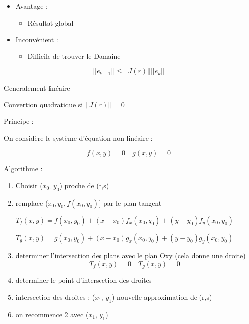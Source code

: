 
\begin{itemize}
    \item Avantage : 
    \begin{itemize}
        \item Résultat global 
    \end{itemize}
    \item Inconvénient : 
    \begin{itemize}
        \item Difficile de trouver le Domaine
    \end{itemize}
\end{itemize}


$$||e_{k+1}|| \leq ||J(r)|| ||e_k||$$

Generalement linéaire

Convertion quadratique si $||J(r)|| = 0$


Principe :

On considère le système d'équation non linéaire :

$$f(x,y) = 0 \quad g(x,y) = 0$$

Algorithme :

\begin{enumerate}
    \item Choisir ($x_0$, $y_0$) proche de (r,s)
    \item remplace ($x_0, y_0,f(x_0, y_0)$) par le plan tangent

    {\hspace*{-1.5cm}$ T_f(x,y) = f(x_0, y_0) + (x-x_0) f_x(x_0, y_0) + (y-y_0) f_y(x_0, y_0)$}
    
    {\hspace*{-1.5cm}$ T_g(x,y) = g(x_0, y_0) + (x-x_0) g_x(x_0, y_0) + (y-y_0) g_y(x_0, y_0)$}
    
    \item determiner l'intersection des plans avec le plan Oxy (cela donne une droite)
    \hspace{-1cm}$$T_f(x,y) = 0 \quad T_g(x,y) = 0$$

    \item determiner le point d'intersection des droites
    \item intersection des droites : ($x_1$, $y_1$) nouvelle approximation de (r,s)
    \item on recommence 2 avec ($x_1$, $y_1$)
\end{enumerate}

